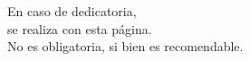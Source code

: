 
\cleardoublepage
\thispagestyle{empty} %

\begin{minipage}[c][\textheight][c]{\textwidth} %
\raggedleft %

En caso de dedicatoria, \\
se realiza con esta página.\\
No es obligatoria, si bien es recomendable.

\bigskip

\emph{\tfgauthorname}

\end{minipage}

\blankpage
